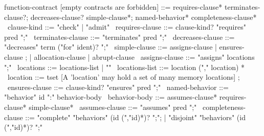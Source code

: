 \begin{syntax}
  function-contract [empty contracts are forbidden] ::= requires-clause* terminates-clause?;
                        decreases-clause? simple-clause*;
                        named-behavior* completeness-clause*
  \
  clause-kind ::= "check" | "admit"
  \
  requires-clause ::= clause-kind? "requires" pred ";"
  \
  terminates-clause ::= "terminates" pred ";"
  \
  decreases-clause ::= "decreases" term ("for" ident)? ";"
  \
  simple-clause ::= assigns-clause | ensures-clause ;
                | allocation-clause | abrupt-clause 
  \
  assigns-clause ::= "assigns" locations ";"
  \
  locations ::= locations-list | "\nothing"
  \
  locations-list ::= location ("," location) *
  \
  location ::= tset [A 'location' may hold a set of many memory locations] ;
  \
  ensures-clause ::= clause-kind? "ensures" pred ";"
  \
  named-behavior ::= "behavior" id ":" behavior-body
  \
  behavior-body ::= assumes-clause* requires-clause* simple-clause* 
  \
  assumes-clause ::= "assumes" pred ";"
  \
  completeness-clause ::= "complete" "behaviors" (id (","id)*)? ";";
     | "disjoint" "behaviors" (id (","id)*)? ";"
\end{syntax}
